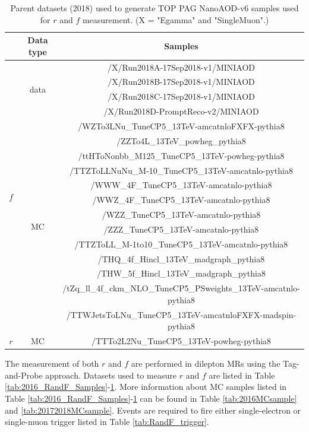 \begin{table}[htbp]
\sffamily
 \begin{center}
 \caption{Parent datasets (2018) used to generate TOP PAG NanoAOD-v6 samples used for $r$ and $f$ measurement. (\small{X = "Egamma" and "SingleMuon".)
 }}
 \label{tab:2018_RandF_Samples}
 \begin{tabular}{c|c|c}
  \hline
  & Data type & Samples  \\  
  \hline\hline
  \multirow{17}{*}{$f$} & \multirow{4}{*}{data} &
  /X/Run2018A-17Sep2018-v1/MINIAOD \\
  & &/X/Run2018B-17Sep2018-v1/MINIAOD \\
  & &/X/Run2018C-17Sep2018-v1/MINIAOD \\
  & &/X/Run2018D-PromptReco-v2/MINIAOD \\ \cline{2-3}
  & \multirow{13}{*}{MC} &
  /WZTo3LNu\_TuneCP5\_13TeV-amcatnloFXFX-pythia8 \\
  & & /ZZTo4L\_13TeV\_powheg\_pythia8 \\
  & & /ttHToNonbb\_M125\_TuneCP5\_13TeV-powheg-pythia8\\
  & & /TTZToLLNuNu\_M-10\_TuneCP5\_13TeV-amcatnlo-pythia8 \\
  & & /WWW\_4F\_TuneCP5\_13TeV-amcatnlo-pythia8 \\
  & & /WWZ\_4F\_TuneCP5\_13TeV-amcatnlo-pythia8 \\
  & & /WZZ\_TuneCP5\_13TeV-amcatnlo-pythia8 \\
  & & /ZZZ\_TuneCP5\_13TeV-amcatnlo-pythia8 \\ 
  & &/TTZToLL\_M-1to10\_TuneCP5\_13TeV-amcatnlo-pythia8 \\
  & & /THQ\_4f\_Hincl\_13TeV\_madgraph\_pythia8 \\
  & & /THW\_5f\_Hincl\_13TeV\_madgraph\_pythia8 \\
  & & /tZq\_ll\_4f\_ckm\_NLO\_TuneCP5\_PSweights\_13TeV-amcatnlo-pythia8 \\
  & & /TTWJetsToLNu\_TuneCP5\_13TeV-amcatnloFXFX-madspin-pythia8 \\ \hline
  $r$ & MC& /TTTo2L2Nu\_TuneCP5\_13TeV-powheg-pythia8 \\ \hline
 \end{tabular}
 \end{center}
\end{table}

The measurement of both $r$ and $f$ are performed in dilepton MRs using the Tag-and-Probe approach. Datasets used to measure $r$ and $f$ are listed in Table \ref{tab:2016_RandF_Samples}-\ref{tab:2018_RandF_Samples}. More information about MC samples listed in Table \ref{tab:2016_RandF_Samples}-\ref{tab:2018_RandF_Samples} can be found in Table \ref{tab:2016MCsample} and \ref{tab:20172018MCsample}. Events are required to fire either single-electron or single-muon trigger listed in Table \ref{tab:RandF_trigger}. 

